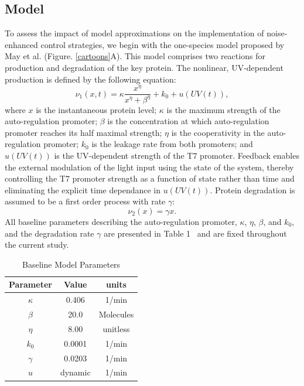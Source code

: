 \documentclass[12pt]{iopart}
\begin{document}
\subsection{Model}\label{sec:Model}
To assess the impact of model approximations on the implementation of noise-enhanced control strategies, we begin with the one-species model proposed by May et al. \cite{May2021} (Figure. \ref{cartoons}A). 
This model comprises two reactions for production and degradation of the key protein. 
The nonlinear, UV-dependent production is defined by the following equation:
\begin{equation}
\nu_1(x,t)= \kappa\frac{x^\eta}{x^\eta+\beta^\eta}+ k_0 + u(UV(t)),
\label{prodRate}
\end{equation}
%
%
where $x$ is the instantaneous protein level; $\kappa$ is the maximum strength of the auto-regulation promoter; $\beta$ is the concentration at which auto-regulation promoter reaches its half maximal strength; $\eta$ is the cooperativity in the auto-regulation promoter; $k_0$ is the leakage rate from both promoters; and $u(UV(t))$ is the UV-dependent strength of the T7 promoter. 
Feedback enables the external modulation of the light input using the state of the system, thereby controlling the T7 promoter strength as a function of state rather than time and eliminating the explicit time dependance in $u(UV(t))$.
Protein degradation is assumed to be a first order process with rate $\gamma$:
\begin{equation}
\nu_2(x) = \gamma x.
\end{equation}
All baseline parameters describing the auto-regulation promoter, $\kappa$, $\eta$, $\beta$, and $k_0$, and the degradation rate $\gamma$ are presented in Table 1~\cite{May2021} and are fixed throughout the current study.

\begin{table}[]
\caption{Baseline Model Parameters}
\begin{center}
\begin{tabular}{|c|c|c|}
\hline
Parameter & Value   & units                     \\ \hline \hline
$\kappa$         & 0.406   & 1/min \\ \hline
$\beta$          & 20.0    & Molecules            \\  \hline
$\eta $           & 8.00    & unitless          \\  \hline
$k_0$           & 0.0001  & 1/min \\  \hline
$\gamma$         & 0.0203  & 1/min         \\  \hline
$u$              & dynamic & 1/min \\ \hline
\end{tabular}
\label{table}
\end{center}
\vspace{-0.2in}
\end{table}
\end{document}
